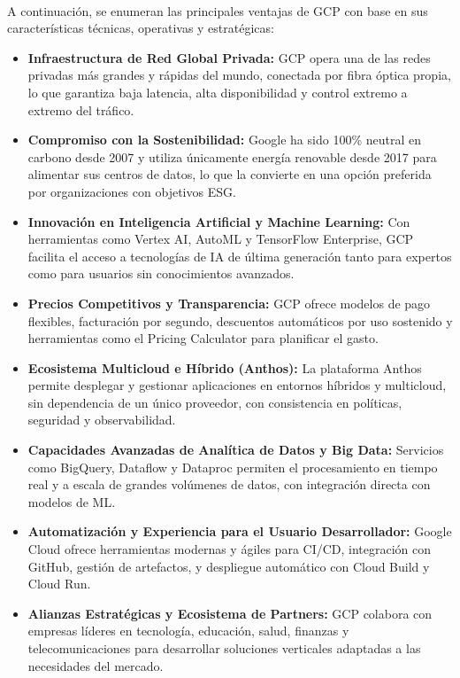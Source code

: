 {                \paragraph{}A continuación, se enumeran las principales ventajas de GCP con base en sus características técnicas, operativas y estratégicas:
                
                \begin{itemize}
                    \item \textbf{Infraestructura de Red Global Privada:} GCP opera una de las redes privadas más grandes y rápidas del mundo, conectada por fibra óptica propia, lo que garantiza baja latencia, alta disponibilidad y control extremo a extremo del tráfico.
                    \item \textbf{Compromiso con la Sostenibilidad:} Google ha sido 100\% neutral en carbono desde 2007 y utiliza únicamente energía renovable desde 2017 para alimentar sus centros de datos, lo que la convierte en una opción preferida por organizaciones con objetivos ESG.
                    \item \textbf{Innovación en Inteligencia Artificial y Machine Learning:} Con herramientas como Vertex AI, AutoML y TensorFlow Enterprise, GCP facilita el acceso a tecnologías de IA de última generación tanto para expertos como para usuarios sin conocimientos avanzados.
                    \item \textbf{Precios Competitivos y Transparencia:} GCP ofrece modelos de pago flexibles, facturación por segundo, descuentos automáticos por uso sostenido y herramientas como el Pricing Calculator para planificar el gasto.
                    \item \textbf{Ecosistema Multicloud e Híbrido (Anthos):} La plataforma Anthos permite desplegar y gestionar aplicaciones en entornos híbridos y multicloud, sin dependencia de un único proveedor, con consistencia en políticas, seguridad y observabilidad.
                    \item \textbf{Capacidades Avanzadas de Analítica de Datos y Big Data:} Servicios como BigQuery, Dataflow y Dataproc permiten el procesamiento en tiempo real y a escala de grandes volúmenes de datos, con integración directa con modelos de ML.
                    \item \textbf{Automatización y Experiencia para el Usuario Desarrollador:} Google Cloud ofrece herramientas modernas y ágiles para CI/CD, integración con GitHub, gestión de artefactos, y despliegue automático con Cloud Build y Cloud Run.
                    \item \textbf{Alianzas Estratégicas y Ecosistema de Partners:} GCP colabora con empresas líderes en tecnología, educación, salud, finanzas y telecomunicaciones para desarrollar soluciones verticales adaptadas a las necesidades del mercado.
                \end{itemize}
                
}

